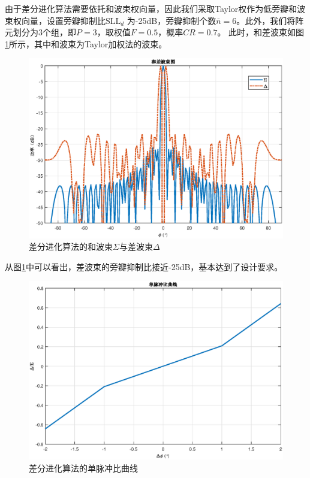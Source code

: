 \documentclass[master]{thesis-uestc}
\begin{document}
由于差分进化算法需要依托和波束权向量，因此我们采取Taylor权作为低旁瓣和波束权向量，设置旁瓣抑制比$\text{SLL}_d$
为-25dB，旁瓣抑制个数$\bar{n}=6$。此外，我们将阵元划分为3个组，即$P=3$，取权值$F=0.5$，概率$CR=0.7$。
此时，和差波束如图\ref{DE_sigma_delta}所示，其中和波束为Taylor加权法的波束。
\begin{figure}[H]
    \includegraphics[scale=0.5]{pic/DE_sigma_delta.eps}
    \caption{差分进化算法的和波束$\Sigma$与差波束$\Delta$}
    \label{DE_sigma_delta}
\end{figure}

从图\ref{DE_sigma_delta}中可以看出，差波束的旁瓣抑制比接近-25dB，基本达到了设计要求。
\begin{figure}[H]
    \includegraphics[scale=0.5]{pic/DE_MRC.eps}
    \caption{差分进化算法的单脉冲比曲线}
    \label{DE_MRC}
\end{figure}
\end{document}
